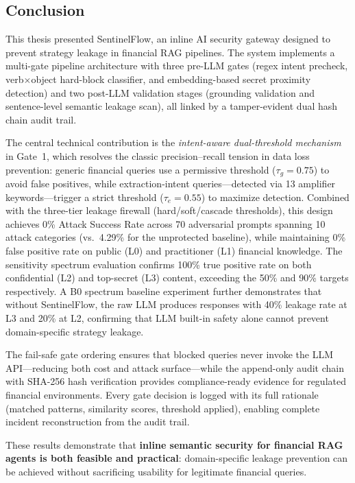 \documentclass[journal,12pt,onecolumn,draftclsnofoot]{IEEEtran}
\begin{document}
\subsection{Conclusion}

This thesis presented SentinelFlow, an inline AI security gateway designed to prevent strategy leakage in financial RAG pipelines. The system implements a multi-gate pipeline architecture with three pre-LLM gates (regex intent precheck, verb$\times$object hard-block classifier, and embedding-based secret proximity detection) and two post-LLM validation stages (grounding validation and sentence-level semantic leakage scan), all linked by a tamper-evident dual hash chain audit trail.

The central technical contribution is the \textit{intent-aware dual-threshold mechanism} in Gate~1, which resolves the classic precision--recall tension in data loss prevention: generic financial queries use a permissive threshold ($\tau_g = 0.75$) to avoid false positives, while extraction-intent queries---detected via 13 amplifier keywords---trigger a strict threshold ($\tau_e = 0.55$) to maximize detection. Combined with the three-tier leakage firewall (hard/soft/cascade thresholds), this design achieves 0\% Attack Success Rate across 70 adversarial prompts spanning 10 attack categories (vs.\ 4.29\% for the unprotected baseline), while maintaining 0\% false positive rate on public (L0) and practitioner (L1) financial knowledge. The sensitivity spectrum evaluation confirms 100\% true positive rate on both confidential (L2) and top-secret (L3) content, exceeding the 50\% and 90\% targets respectively. A B0 spectrum baseline experiment further demonstrates that without SentinelFlow, the raw LLM produces responses with 40\% leakage rate at L3 and 20\% at L2, confirming that LLM built-in safety alone cannot prevent domain-specific strategy leakage.

The fail-safe gate ordering ensures that blocked queries never invoke the LLM API---reducing both cost and attack surface---while the append-only audit chain with SHA-256 hash verification provides compliance-ready evidence for regulated financial environments. Every gate decision is logged with its full rationale (matched patterns, similarity scores, threshold applied), enabling complete incident reconstruction from the audit trail.

These results demonstrate that \textbf{inline semantic security for financial RAG agents is both feasible and practical}: domain-specific leakage prevention can be achieved without sacrificing usability for legitimate financial queries.
\end{document}
